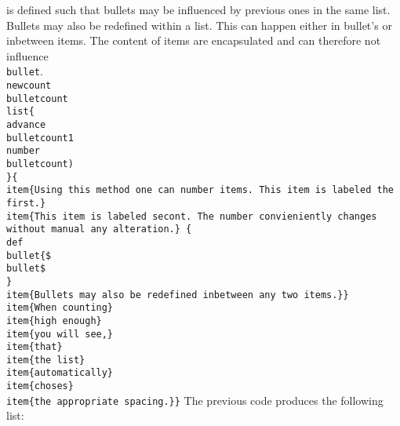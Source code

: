 \noindent{\tt\\bullet} is defined such that bullets may be influenced by previous ones in the same list. Bullets may also be redefined within a list. This can happen either in bullet's or inbetween items. The content of items are encapsulated and can therefore not influence {\tt\\bullet}.\hfil\break
{\tt\\newcount\\bulletcount\hfil\break
\\list\{\\advance\\bulletcount1 \\number\\bulletcount)\\ \}\{\hfil\break
\\item\{Using this method one can number items.\hfil\break
This item is labeled the first.\}\hfil\break
\\item\{This item is labeled secont.\hfil\break
The number convieniently changes without manual any alteration.\}\hfil\break
\{\\def\\bullet\{\$\\bullet\$\\ \}\hfil\break
\\item\{Bullets may also be redefined inbetween any two items.\}\}\hfil\break
\\item\{When counting\}\hfil\break
\\item\{high enough\}\hfil\break
\\item\{you will see,\}\hfil\break
\\item\{that\}\hfil\break
\\item\{the list\}\hfil\break
\\item\{automatically\}\hfil\break
\\item\{choses\}\hfil\break
\\item\{the appropriate spacing.\}\}}\hfil\break
The previous code produces the following list:\hfil\break
\newcount\bulletcount

